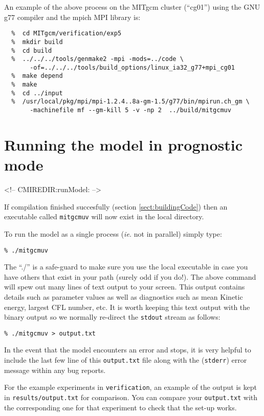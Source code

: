 An example of the above process on the MITgcm cluster (``cg01'') using
the GNU g77 compiler and the mpich MPI library is:

{\footnotesize \begin{verbatim}
  %  cd MITgcm/verification/exp5
  %  mkdir build
  %  cd build
  %  ../../../tools/genmake2 -mpi -mods=../code \
       -of=../../../tools/build_options/linux_ia32_g77+mpi_cg01
  %  make depend
  %  make
  %  cd ../input
  %  /usr/local/pkg/mpi/mpi-1.2.4..8a-gm-1.5/g77/bin/mpirun.ch_gm \
       -machinefile mf --gm-kill 5 -v -np 2  ../build/mitgcmuv
\end{verbatim} }

\section[Running MITgcm]{Running the model in prognostic mode}
\label{sect:runModel}
\begin{rawhtml}
<!-- CMIREDIR:runModel: -->
\end{rawhtml}

If compilation finished succesfully (section \ref{sect:buildingCode})
then an executable called \texttt{mitgcmuv} will now exist in the
local directory.

To run the model as a single process (\textit{ie.} not in parallel)
simply type:
\begin{verbatim}
% ./mitgcmuv
\end{verbatim}
The ``./'' is a safe-guard to make sure you use the local executable
in case you have others that exist in your path (surely odd if you
do!). The above command will spew out many lines of text output to
your screen.  This output contains details such as parameter values as
well as diagnostics such as mean Kinetic energy, largest CFL number,
etc. It is worth keeping this text output with the binary output so we
normally re-direct the \texttt{stdout} stream as follows:
\begin{verbatim}
% ./mitgcmuv > output.txt
\end{verbatim}
In the event that the model encounters an error and stops, it is very
helpful to include the last few line of this \texttt{output.txt} file
along with the (\texttt{stderr}) error message within any bug reports.

For the example experiments in \texttt{verification}, an example of the
output is kept in \texttt{results/output.txt} for comparison. You can
compare your \texttt{output.txt} with the corresponding one for that
experiment to check that the set-up works.



